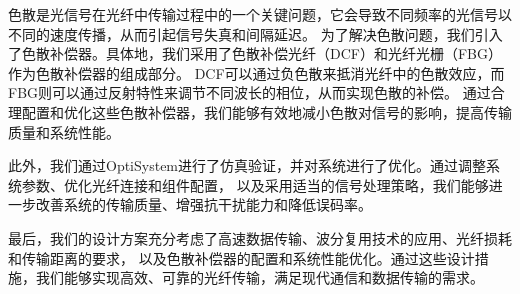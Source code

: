 \documentclass[12pt]{article}
\begin{document}
色散是光信号在光纤中传输过程中的一个关键问题，它会导致不同频率的光信号以不同的速度传播，从而引起信号失真和间隔延迟。
为了解决色散问题，我们引入了色散补偿器。具体地，我们采用了色散补偿光纤（DCF）和光纤光栅（FBG）作为色散补偿器的组成部分。
DCF可以通过负色散来抵消光纤中的色散效应，而FBG则可以通过反射特性来调节不同波长的相位，从而实现色散的补偿。
通过合理配置和优化这些色散补偿器，我们能够有效地减小色散对信号的影响，提高传输质量和系统性能。

此外，我们通过OptiSystem进行了仿真验证，并对系统进行了优化。通过调整系统参数、优化光纤连接和组件配置，
以及采用适当的信号处理策略，我们能够进一步改善系统的传输质量、增强抗干扰能力和降低误码率。

最后，我们的设计方案充分考虑了高速数据传输、波分复用技术的应用、光纤损耗和传输距离的要求，
以及色散补偿器的配置和系统性能优化。通过这些设计措施，我们能够实现高效、可靠的光纤传输，满足现代通信和数据传输的需求。
\clearpage












\pagestyle{headings}


\end{document}
